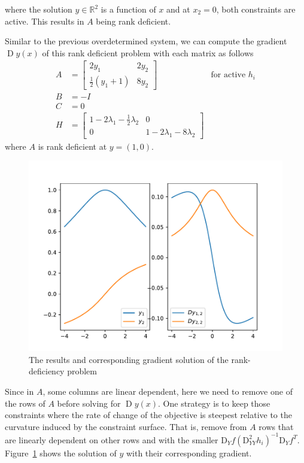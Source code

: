 where the solution $y \in \mathbb{R}^2$ is a function of $x$ and at $x_2 = 0$, both constraints are active. This results in $A$ being rank deficient. 
\par Similar to the previous overdetermined system, we can compute the gradient $\operatorname{D}y(x)$ of this rank deficient problem with each matrix as follows
$$
\begin{array}{lll}
    A &= \begin{bmatrix}
         2y_1 & 2 y_2 \\ \frac{1}{2} (y_1 + 1) & 8 y_2
         \end{bmatrix} & \text{for active $h_i$} \\
    B &= -I \\
    C &= 0 \\
    H &= \begin{bmatrix}
         1 - 2 \lambda_1 - \frac{1}{2} \lambda_2 & 0 \\
         0 & 1 - 2 \lambda_1 - 8 \lambda_2
         \end{bmatrix}
\end{array}
$$
where $A$ is rank deficient at $y = (1, 0)$. 

\begin{figure}[t]
    \label{fig:rank-deficiency-gradient}
    \centering
    \includegraphics[page=1, width=.8\textwidth]{figs/gradient-rank-deficient.pdf}
    \caption{The results and corresponding gradient solution of the rank-deficiency problem}
\end{figure}
\par Since in $A$, some columns are linear dependent, here we need to remove one of the rows of $A$ before solving for $\operatorname{D}y(x)$. One strategy is to keep those constraints where the rate of change of the objective is steepest relative to the curvature induced by the constraint surface. That is, remove from $A$ rows that are linearly dependent on other rows and with the smaller $\text{D}_{Y}f (\text{D}_{YY}^2 h_i)^{-1} \text{D}_{Y}f^T$. Figure~\ref{fig:rank-deficiency-gradient} shows the solution of $y$ with their corresponding gradient. 

